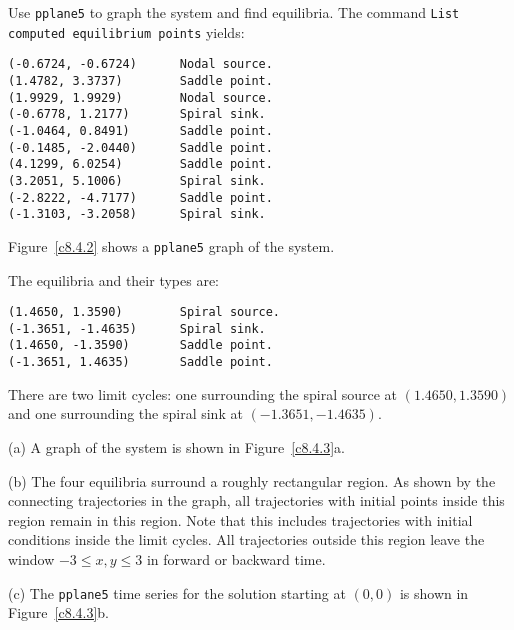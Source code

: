 \documentclass{ximera}
\begin{document}
\begin{figure}[htb]
                       \centerline{%
                       }
\end{figure}

Use {\tt pplane5} to graph the system and find equilibria.  The
command {\tt List computed equilibrium points} yields:
\begin{verbatim}
(-0.6724, -0.6724)      Nodal source.
(1.4782, 3.3737)        Saddle point.
(1.9929, 1.9929)        Nodal source.
(-0.6778, 1.2177)       Spiral sink.
(-1.0464, 0.8491)       Saddle point.
(-0.1485, -2.0440)      Saddle point.
(4.1299, 6.0254)        Saddle point.
(3.2051, 5.1006)        Spiral sink.
(-2.8222, -4.7177)      Saddle point.
(-1.3103, -3.2058)      Spiral sink.
\end{verbatim}
Figure~\ref{c8.4.2} shows a {\tt pplane5} graph of the system.

\begin{figure}[htb]
                       \centerline{%
                       }
\end{figure}

The equilibria and their types are:
\begin{verbatim}
(1.4650, 1.3590)        Spiral source.           
(-1.3651, -1.4635)      Spiral sink.             
(1.4650, -1.3590)       Saddle point.            
(-1.3651, 1.4635)       Saddle point. 
\end{verbatim}
There are two limit cycles: one surrounding the spiral source at
$(1.4650, 1.3590)$ and one surrounding the spiral sink at $(-1.3651, -1.4635)$.

(a) A graph of the system is shown in Figure~\ref{c8.4.3}a.

(b) The four equilibria surround a roughly rectangular region.  As shown
by the connecting trajectories in the graph, all trajectories with
initial points inside this region remain in this region.  Note that this
includes trajectories with initial conditions inside the limit cycles.
All trajectories outside this region leave the window
$-3 \leq x,y \leq 3$ in forward or backward time.

(c) The {\tt pplane5} time series for the solution starting at $(0,0)$ is
shown in Figure~\ref{c8.4.3}b.

\begin{figure}[htb]
                       \centerline{%
                       }
\end{figure}
\end{document}
